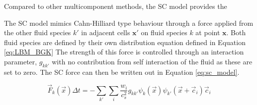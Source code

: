 

Compared to other multicomponent methods, the SC model provides the 

The SC model mimics Cahn-Hilliard type behaviour through a force applied from the other fluid species $k'$ in adjacent 
cells $\mathbf{x'}$ on fluid species $k$ at point $\mathbf{x}$. \cite{shan_lattice_1993, shan_simulation_1994, 
shan_multicomponent_1995, he_discrete_1998, jansen_bijels_2011, chin_lattice_2002} Both fluid species are defined
by their own distribution equation defined in Equation \ref{eq:LBM_BGK} The strength of this force is controlled 
through an interaction parameter, $g_{kk'}$ with no contribution from self interaction of the fluid as these are 
set to zero. The SC force can then be written out in Equation \ref{eq:sc_model}.

\begin{equation}
\vec{F}_k(\vec{x}) \Delta t = - \sum_{k'} \sum_i \frac{w_i}{c_s^2} g_{kk'} \psi_k(\vec{x})\psi_{k'}(\vec{x}+\vec{c}_i) \vec{c}_i
\label{eq:sc_model}
\end{equation}

